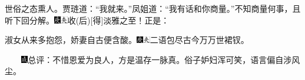 {\kaishu 世俗之态熏人。}贾琏道：``我就来。''凤姐道：``我有话和你商量。''不知商量何事，且听下回分解。{\includegraphics[width=3mm]{../Images/00004}\includegraphics[width=3mm]{../Images/00012}\footnotesize \kaishu 收{(后)}{[}得{]}淡雅之至！}正是：

淑女从来多抱怨，娇妻自古便含酸。{\includegraphics[width=3mm]{../Images/00004}\includegraphics[width=3mm]{../Images/00012}\footnotesize \kaishu 二语包尽古今万万世裙钗。}

{　　\includegraphics[width=3mm]{../Images/00005}总评：不惜恩爱为良人，方是温存一脉真。俗子妒妇浑可笑，语言偏自涉风尘。}

